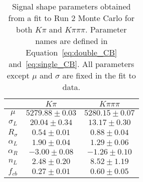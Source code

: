 \documentclass{article}
\begin{document}
\begin{table}[H]
    \centering
    \begin{tabular}{ccc}
        \toprule
        & $K\pi$ & $K\pi\pi\pi$ \\
        \midrule
        $\mu$ &  $5279.88 \pm 0.03$ & $5280.15 \pm 0.07$ \\
        $\sigma_L$ & $20.04 \pm 0.34$ & $13.17 \pm 0.30$ \\
        $R_{\sigma}$ & $0.54 \pm 0.01$ & $0.88 \pm 0.04$ \\
        $\alpha_L$ & $1.90 \pm 0.04$ & $1.29 \pm 0.06$ \\
        $\alpha_R$ & $-3.00 \pm 0.08$ & $-1.26 \pm 0.10$ \\
        $n_L$ & $2.48 \pm 0.20$ & $8.52 \pm 1.19$ \\
        $f_{cb}$ & $0.27 \pm 0.01$ & $0.60 \pm 0.05$ \\
       \bottomrule
       \end{tabular}
    \caption{Signal shape parameters obtained from a fit to Run 2 Monte Carlo for both $K\pi$ and $K\pi\pi\pi$. Parameter names are defined in Equation~\ref{eq:double_CB} and~\ref{eq:single_CB}. All parameters except $\mu$ and $\sigma$ are fixed in the fit to data.}
\label{tab:MC_signal_params}
\end{table}
\end{document}
